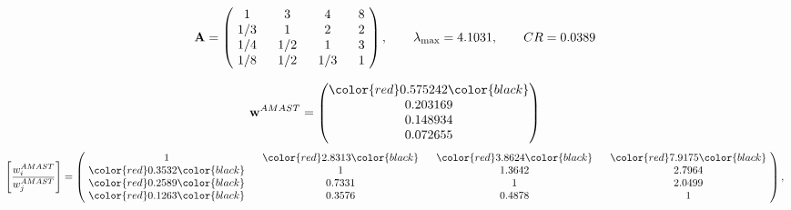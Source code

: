 \begin{example}
\begin{equation*}
\mathbf{A} =
\begin{pmatrix}
$\,\,$ 1 $\,\,$ & $\,\,$3$\,\,$ & $\,\,$4$\,\,$ & $\,\,$8 $\,\,$ \\
$\,\,$ 1/3$\,\,$ & $\,\,$ 1 $\,\,$ & $\,\,$2$\,\,$ & $\,\,$2 $\,\,$ \\
$\,\,$ 1/4$\,\,$ & $\,\,$ 1/2$\,\,$ & $\,\,$ 1 $\,\,$ & $\,\,$3 $\,\,$ \\
$\,\,$ 1/8$\,\,$ & $\,\,$ 1/2$\,\,$ & $\,\,$ 1/3$\,\,$ & $\,\,$ 1  $\,\,$ \\
\end{pmatrix},
\qquad
\lambda_{\max} =
4.1031,
\qquad
CR = 0.0389
\end{equation*}

\begin{equation*}
\mathbf{w}^{AMAST} =
\begin{pmatrix}
\color{red} 0.575242\color{black} \\
0.203169\\
0.148934\\
0.072655
\end{pmatrix}\end{equation*}
\begin{equation*}
\left[ \frac{{w}^{AMAST}_i}{{w}^{AMAST}_j} \right] =
\begin{pmatrix}
$\,\,$ 1 $\,\,$ & $\,\,$\color{red} 2.8313\color{black} $\,\,$ & $\,\,$\color{red} 3.8624\color{black} $\,\,$ & $\,\,$\color{red} 7.9175\color{black} $\,\,$ \\
$\,\,$\color{red} 0.3532\color{black} $\,\,$ & $\,\,$ 1 $\,\,$ & $\,\,$1.3642$\,\,$ & $\,\,$2.7964  $\,\,$ \\
$\,\,$\color{red} 0.2589\color{black} $\,\,$ & $\,\,$0.7331$\,\,$ & $\,\,$ 1 $\,\,$ & $\,\,$2.0499 $\,\,$ \\
$\,\,$\color{red} 0.1263\color{black} $\,\,$ & $\,\,$0.3576$\,\,$ & $\,\,$0.4878$\,\,$ & $\,\,$ 1  $\,\,$ \\
\end{pmatrix},
\end{equation*}


\end{example}
